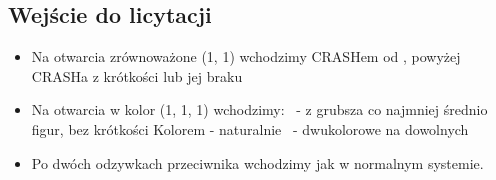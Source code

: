 \documentclass[12pt, a4paper]{article}
\begin{document}
\subsection{Wejście do licytacji}
\begin{itemize}
    \item Na otwarcia zrównoważone (1\clubs, 1\nt) wchodzimy CRASHem od \dbl, powyżej CRASHa z krótkości lub jej braku
    \item Na otwarcia w kolor (1\diams, 1\hearts, 1\spades) wchodzimy:
    \subitem \dbl\ - z grubsza co najmniej średnio figur, bez krótkości
    \subitem Kolorem - naturalnie
    \nt\ - dwukolorowe na dowolnych
    \item Po dwóch odzywkach przeciwnika wchodzimy jak w normalnym systemie.
\end{itemize}
\end{document}
